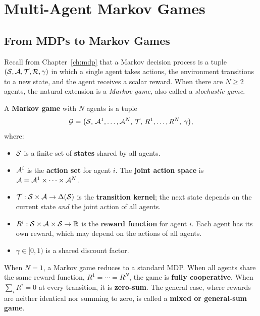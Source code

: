 \section{Multi-Agent Markov Games}
\label{sec:markov-games}

\subsection{From MDPs to Markov Games}

Recall from Chapter~\ref{ch:mdp} that a Markov decision process is
a tuple $(\mathcal{S}, \mathcal{A}, \mathcal{T}, \mathcal{R}, \gamma)$ in which a single agent takes
actions, the environment transitions to a new state, and the agent
receives a scalar reward. When there are $N \geq 2$ agents, the
natural extension is a \emph{Markov game},
also called a \emph{stochastic game}.

\begin{definition}
\label{def:markov-game}
A \textbf{Markov game} with $N$ agents is a tuple
\[
  \mathcal{G} = \bigl(\mathcal{S},\, \mathcal{A}^1, \ldots, \mathcal{A}^N,\, \mathcal{T},\,
                       R^1, \ldots, R^N,\, \gamma\bigr),
\]
where:
\begin{itemize}[leftmargin=*]
  \item $\mathcal{S}$ is a finite set of \textbf{states} shared by all agents.
  \item $\mathcal{A}^i$ is the \textbf{action set} for agent $i$. The
    \textbf{joint action space} is $\mathcal{A} = \mathcal{A}^1 \times \cdots \times \mathcal{A}^N$.
  \item $\mathcal{T} : \mathcal{S} \times \mathcal{A} \to \Delta(\mathcal{S})$ is the
    \textbf{transition kernel}; the next state depends on the current
    state \emph{and} the joint action of all agents.
  \item $R^i : \mathcal{S} \times \mathcal{A} \times \mathcal{S} \to \mathbb{R}$ is the
    \textbf{reward function} for agent $i$. Each agent has its own
    reward, which may depend on the actions of all agents.
  \item $\gamma \in [0,1)$ is a shared discount factor.
\end{itemize}
\end{definition}

When $N = 1$, a Markov game reduces to a standard MDP. When all
agents share the same reward function, $R^1 = \cdots = R^N$, the game
is \textbf{fully cooperative}. When
$\sum_i R^i = 0$ at every transition, it is \textbf{zero-sum}.
The general case, where rewards are neither identical nor summing to
zero, is called a \textbf{mixed or general-sum
game}.

